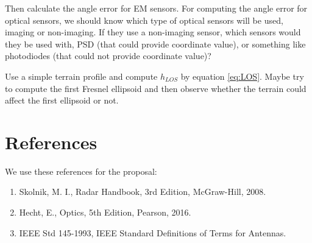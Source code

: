 \documentclass{article}
\begin{document}
Then calculate the angle error for EM sensors. For computing the angle error for optical sensors, we should know which type of optical sensors will be used, imaging or non-imaging. If they use a non-imaging sensor, which sensors would they be used with, PSD (that could provide coordinate value), or something like photodiodes (that could not provide coordinate value)?

Use a simple terrain profile and compute $h_{LOS}$ by equation \ref{eq:LOS}. Maybe try to compute the first Fresnel ellipsoid and then observe whether the terrain could affect the first ellipsoid or not.


\section{References}
We use these references for the proposal:
\begin{enumerate}
    \item Skolnik, M. I., Radar Handbook, 3rd Edition, McGraw-Hill, 2008.
    \item Hecht, E., Optics, 5th Edition, Pearson, 2016.
    \item IEEE Std 145-1993, IEEE Standard Definitions of Terms for Antennas.
\end{enumerate}
\end{document}
